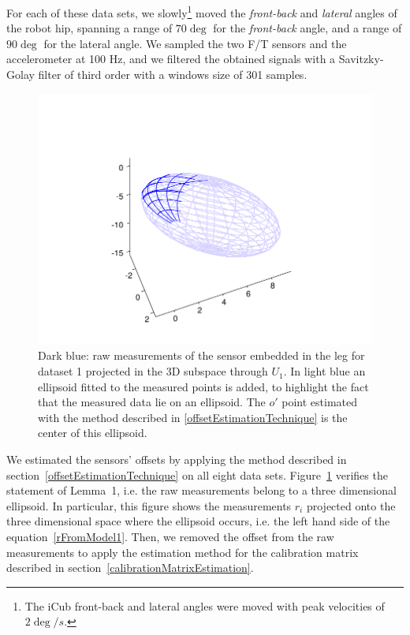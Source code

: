 For each of these data sets, we slowly\footnote{The iCub front-back and lateral angles were moved with peak velocities of $2 \deg/s$.} 
moved the \emph{front-back} and
\emph{lateral} angles of the robot hip, spanning a range of $70 \deg$ for the \emph{front-back} angle, and a range of $90 \deg$ for the lateral angle. 
We sampled the two F/T sensors and the accelerometer at 100 Hz, and we filtered the obtained signals with a Savitzky-Golay filter of third order 
with a windows size of 301 samples. 

\begin{figure}
\vspace{0.5em}
 \centering
 \includegraphics[width=1.0\textwidth]{images/raw_ellipsoid.pdf}
 \caption{Dark blue: raw measurements of the sensor embedded in the leg for dataset 1 projected in the 3D subspace through $U_1$.
 In light blue an ellipsoid fitted to the measured points is added, to highlight the fact that the measured data lie on an ellipsoid. The $o'$ point estimated 
 with the method described in \ref{offsetEstimationTechnique} is the center of this ellipsoid.
  }
 \label{ellipsoidWithRawData}
\end{figure}



We estimated the sensors' offsets by applying the method described in section~\ref{offsetEstimationTechnique} on all eight data sets. 
Figure~\ref{ellipsoidWithRawData} verifies the statement of Lemma~1, i.e. the raw measurements belong to a three dimensional ellipsoid. 
In particular, this figure shows the measurements
$r_i$ projected onto the three dimensional space where the ellipsoid occurs, i.e. the left hand side of the equation~\eqref{rFromModel1}. 
Then, we removed the offset from the raw measurements to apply the estimation method for the calibration matrix described in 
section~\ref{calibrationMatrixEstimation}.

